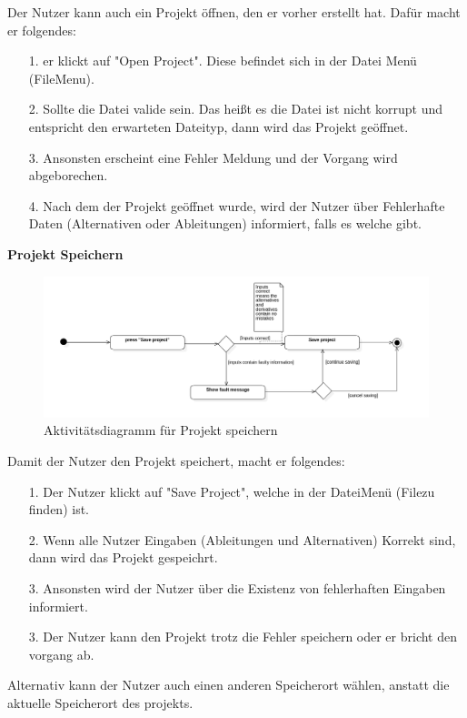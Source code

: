 \documentclass{article}
\begin{document}
Der Nutzer kann auch ein Projekt öffnen, den er vorher erstellt hat. Dafür macht er folgendes:
\begin{enumerate}
    \item[1.] er klickt auf "Open Project". Diese befindet sich in der Datei Menü (FileMenu).
    \item[2.] Sollte die Datei valide sein. Das heißt es die Datei ist nicht korrupt und entspricht den erwarteten Dateityp, dann wird das Projekt geöffnet.
    \item[3.] Ansonsten erscheint eine Fehler Meldung und der Vorgang wird abgeborechen.
    \item[4.] Nach dem der Projekt geöffnet wurde, wird der Nutzer über Fehlerhafte Daten (Alternativen oder Ableitungen) informiert, falls es welche gibt. 
\end{enumerate}

\textbf{\large{Projekt Speichern}}
\begin{figure}[H]%
    \centering
    \includegraphics[width=13cm]{entwurf/Entwurf_dokument/img/Alissa/SaveProjectAD.png}
    \caption{Aktivitätsdiagramm für Projekt speichern}
\end{figure}
Damit der Nutzer den Projekt speichert, macht er folgendes:
\begin{enumerate}
    \item[1.] Der Nutzer klickt auf "Save Project", welche in der Datei\textendash Menü (File\textendash zu finden) ist.
    \item[2.] Wenn alle Nutzer Eingaben (Ableitungen und Alternativen) Korrekt sind, dann wird das Projekt gespeichrt.
    \item[3.] Ansonsten wird der Nutzer über die Existenz von fehlerhaften Eingaben informiert.
    \item[3.] Der Nutzer kann den Projekt trotz die Fehler speichern oder er bricht den vorgang ab. 
\end{enumerate}
Alternativ kann der Nutzer auch einen anderen Speicherort wählen, anstatt die aktuelle Speicherort des projekts.
\end{document}
